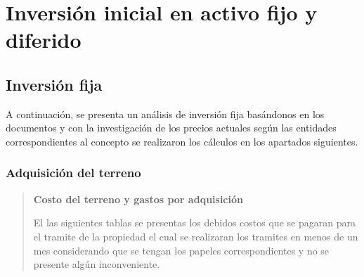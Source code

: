 \section{Inversión inicial en activo fijo y diferido}






\subsection{ Inversión fija}

A continuación, se presenta un análisis de inversión fija basándonos en
los documentos y con la investigación de los precios actuales según las
entidades correspondientes al concepto se realizaron los cálculos en los
apartados siguientes.

\subsubsection{Adquisición del terreno }


\hspace{1cm}

\begin{quote}


\textbf{Costo del terreno y gastos por adquisición}

El las siguientes tablas se presentas los debidos costos que se pagaran
para el tramite de la propiedad el cual se realizaran los tramites en
menos de un mes considerando que se tengan los papeles correspondientes
y no se presente algún inconveniente.
\hspace{1cm}


\end{quote}

